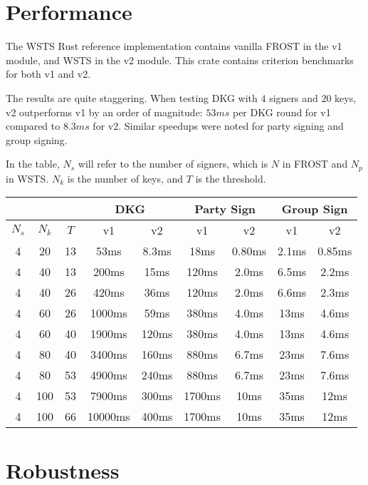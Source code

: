 \documentclass{article}
\begin{document}
\newpage
\onecolumn
\section{
  Performance
}

The WSTS Rust reference implementation \cite{tmfrost} contains vanilla FROST in the v1 module, and WSTS in the v2 module.  This crate contains criterion benchmarks for both v1 and v2.

The results are quite staggering.  When testing DKG with $4$ signers and $20$ keys, v2 outperforms v1 by an order of magnitude: $53 ms$ per DKG round for v1 compared to $8.3 ms$ for v2.  Similar speedups were noted for party signing and group signing.

In the table, $N_s$ will refer to the number of signers, which is $N$ in FROST and $N_p$ in WSTS.  $N_k$ is the number of keys, and $T$ is the threshold.

\begin{center}
  \begin{tabular}{ c|c|c|c|c|c|c|c|c } 
    \multicolumn{3}{c|}{} & \multicolumn{2}{|c|}{DKG}& \multicolumn{2}{|c|}{Party Sign} & \multicolumn{2}{|c}{Group Sign} \\
    \hline
    \hline
    $N_s$ & $N_k$ & $T$ & v1 & v2 & v1 & v2 & v1 & v2 \\ 
    \hline
    \hline
    4 & 20 & 13 & 53ms & 8.3ms & 18ms & 0.80ms & 2.1ms & 0.85ms \\ 
    4 & 40 & 13 & 200ms & 15ms & 120ms & 2.0ms & 6.5ms & 2.2ms \\ 
    4 & 40 & 26 & 420ms & 36ms & 120ms & 2.0ms & 6.6ms & 2.3ms \\ 
    4 & 60 & 26 & 1000ms & 59ms & 380ms & 4.0ms & 13ms & 4.6ms \\ 
    4 & 60 & 40 & 1900ms & 120ms & 380ms & 4.0ms & 13ms & 4.6ms \\ 
    4 & 80 & 40 & 3400ms & 160ms & 880ms & 6.7ms & 23ms & 7.6ms \\ 
    4 & 80 & 53 & 4900ms & 240ms & 880ms & 6.7ms & 23ms & 7.6ms \\ 
    4 & 100 & 53 & 7900ms & 300ms & 1700ms & 10ms & 35ms & 12ms \\ 
    4 & 100 & 66 & 10000ms & 400ms & 1700ms & 10ms & 35ms & 12ms \\ 
  \end{tabular}
\end{center}


\section{
  Robustness
}
\end{document}
